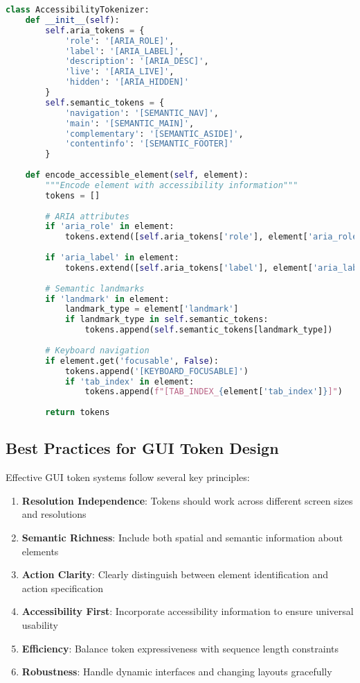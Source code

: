 \begin{lstlisting}[language=Python, caption=Accessibility-aware GUI tokens]
class AccessibilityTokenizer:
    def __init__(self):
        self.aria_tokens = {
            'role': '[ARIA_ROLE]',
            'label': '[ARIA_LABEL]',
            'description': '[ARIA_DESC]',
            'live': '[ARIA_LIVE]',
            'hidden': '[ARIA_HIDDEN]'
        }
        self.semantic_tokens = {
            'navigation': '[SEMANTIC_NAV]',
            'main': '[SEMANTIC_MAIN]',
            'complementary': '[SEMANTIC_ASIDE]',
            'contentinfo': '[SEMANTIC_FOOTER]'
        }
    
    def encode_accessible_element(self, element):
        """Encode element with accessibility information"""
        tokens = []
        
        # ARIA attributes
        if 'aria_role' in element:
            tokens.extend([self.aria_tokens['role'], element['aria_role']])
        
        if 'aria_label' in element:
            tokens.extend([self.aria_tokens['label'], element['aria_label']])
        
        # Semantic landmarks
        if 'landmark' in element:
            landmark_type = element['landmark']
            if landmark_type in self.semantic_tokens:
                tokens.append(self.semantic_tokens[landmark_type])
        
        # Keyboard navigation
        if element.get('focusable', False):
            tokens.append('[KEYBOARD_FOCUSABLE]')
            if 'tab_index' in element:
                tokens.append(f"[TAB_INDEX_{element['tab_index']}]")
        
        return tokens
\end{lstlisting}

\subsection{Best Practices for GUI Token Design}

Effective GUI token systems follow several key principles:

\begin{enumerate}
\item \textbf{Resolution Independence}: Tokens should work across different screen sizes and resolutions
\item \textbf{Semantic Richness}: Include both spatial and semantic information about elements
\item \textbf{Action Clarity}: Clearly distinguish between element identification and action specification
\item \textbf{Accessibility First}: Incorporate accessibility information to ensure universal usability
\item \textbf{Efficiency}: Balance token expressiveness with sequence length constraints
\item \textbf{Robustness}: Handle dynamic interfaces and changing layouts gracefully
\end{enumerate}

